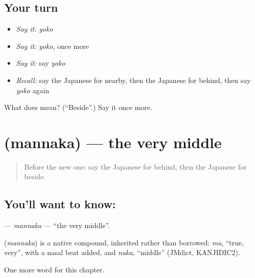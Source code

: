 \subsection*{Your turn}
\begin{itemize}
\raggedright
  \item \emph{Say it:} \emph{yoko}
  \item \emph{Say it:} \emph{yoko}, once more
  \item \emph{Say it:} say \emph{yoko}
  \item \emph{Recall:} say the Japanese for nearby, then the Japanese for behind, then say \emph{yoko} again
\end{itemize}

\begin{tcolorbox}[breakable,colback=teal!4,colframe=teal!35!black,title={Before you move on}]
What does  mean? (\textquotedblleft{}Beside\textquotedblright{}.) Say it once more.
\end{tcolorbox}
\section[\texorpdfstring{\ja{まんなか} (mannaka)}{まんなか (mannaka)}]{ (mannaka) — the very middle}

\label{lesson:JA-C78-mannaka}



\begin{quote}
Before the new one: say the Japanese for behind, then the Japanese for beside.
\end{quote}

\subsection*{You'll want to know: }
\textbf{} — \emph{mannaka} — \textquotedblleft{}the very middle\textquotedblright{}.

\begin{cousinweb}
\textbf{} (\emph{mannaka}) is a native compound, inherited rather than borrowed: \emph{ma}, \textquotedblleft{}true, very\textquotedblright{}, with a nasal beat added, and \emph{naka}, \textquotedblleft{}middle\textquotedblright{} (JMdict, KANJIDIC2).
\end{cousinweb}

\begin{grammarlens}[title={What you've built}]
One more word for this chapter.
\end{grammarlens}

